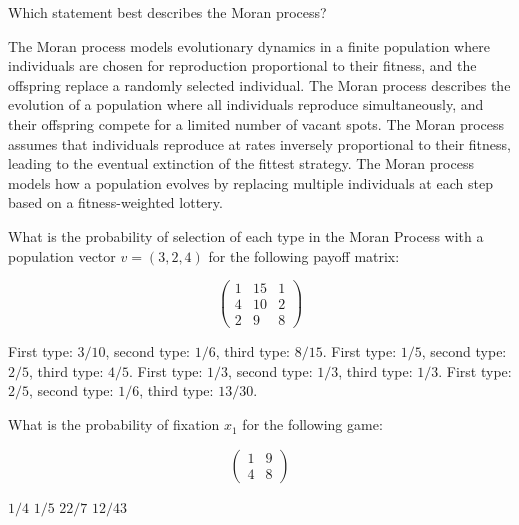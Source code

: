 \documentclass{exam}
\begin{document}
\begin{questions}
        
    \question
    Which statement best describes the Moran process?

    \begin{checkboxes}
        \choice The Moran process models evolutionary dynamics in a finite population where individuals are chosen for reproduction proportional to their fitness, and the offspring replace a randomly selected individual.
            \choice The Moran process describes the evolution of a population where all individuals reproduce simultaneously, and their offspring compete for a limited number of vacant spots.
            \choice The Moran process assumes that individuals reproduce at rates inversely proportional to their fitness, leading to the eventual extinction of the fittest strategy.
            \choice The Moran process models how a population evolves by replacing multiple individuals at each step based on a fitness-weighted lottery.
    \end{checkboxes}

    \question What is the probability of selection of each type in the Moran Process
    with a population vector \(v=(3, 2, 4)\) for the following payoff matrix:

    \[
        \begin{pmatrix}
            1 & 15 & 1\\
            4 & 10 & 2\\
            2 & 9  & 8
        \end{pmatrix}
    \]

    \begin{checkboxes}
        \choice First type: \(3/10\), second type: \(1/6\), third type: \(8/15\).
        \choice First type: \(1/5\), second type: \(2/5\), third type: \(4/5\).
        \choice First type: \(1/3\), second type: \(1/3\), third type: \(1/3\).
        \choice First type: \(2/5\), second type: \(1/6\), third type: \(13/30\).
    \end{checkboxes}

    \question What is the probability of fixation \(x_1\) for the following
    game:

    \[
        \begin{pmatrix}
        1 & 9\\
        4 & 8
        \end{pmatrix}
    \]

    \begin{checkboxes}
        \choice \(1/4\)
        \choice \(1/5\)
        \choice \(22/7\)
        \choice \(12/43\)
\end{checkboxes}

\end{questions}
\end{document}
